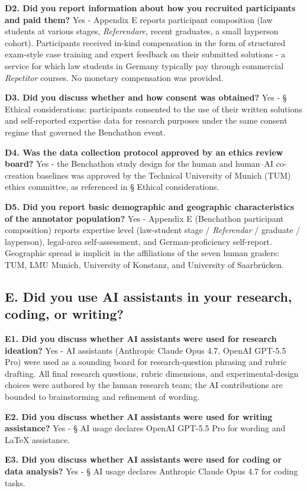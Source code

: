 \documentclass[11pt]{article}
\begin{document}
\textbf{D2. Did you report information about how you recruited
participants and paid them?} Yes - Appendix E reports participant
composition (law students at various stages, \emph{Referendare}, recent
graduates, a small layperson cohort). Participants received in-kind
compensation in the form of structured exam-style case training and
expert feedback on their submitted solutions - a service for which law
students in Germany typically pay through commercial \emph{Repetitor}
courses. No monetary compensation was provided.

\textbf{D3. Did you discuss whether and how consent was obtained?} Yes -
§ Ethical considerations: participants consented to the use of their
written solutions and self-reported expertise data for research purposes
under the same consent regime that governed the Benchathon event.

\textbf{D4. Was the data collection protocol approved by an ethics
review board?} Yes - the Benchathon study design for the human and
human--AI co-creation baselines was approved by the Technical University
of Munich (TUM) ethics committee, as referenced in § Ethical
considerations.

\textbf{D5. Did you report basic demographic and geographic
characteristics of the annotator population?} Yes - Appendix E
(Benchathon participant composition) reports expertise level
(law-student stage / \emph{Referendar} / graduate / layperson),
legal-area self-assessment, and German-proficiency self-report.
Geographic spread is implicit in the affiliations of the seven human
graders: TUM, LMU Munich, University of Konstanz, and University of
Saarbrücken.

\subsection{E. Did you use AI assistants in your research, coding, or
writing?}\label{e.-did-you-use-ai-assistants-in-your-research-coding-or-writing}

\textbf{E1. Did you discuss whether AI assistants were used for research
ideation?} Yes - AI assistants (Anthropic Claude Opus 4.7, OpenAI
GPT-5.5 Pro) were used as a sounding board for research-question
phrasing and rubric drafting. All final research questions, rubric
dimensions, and experimental-design choices were authored by the human
research team; the AI contributions are bounded to brainstorming and
refinement of wording.

\textbf{E2. Did you discuss whether AI assistants were used for writing
assistance?} Yes - § AI usage declares OpenAI GPT-5.5 Pro for wording
and LaTeX assistance.

\textbf{E3. Did you discuss whether AI assistants were used for coding
or data analysis?} Yes - § AI usage declares Anthropic Claude Opus 4.7
for coding tasks.

\end{document}
